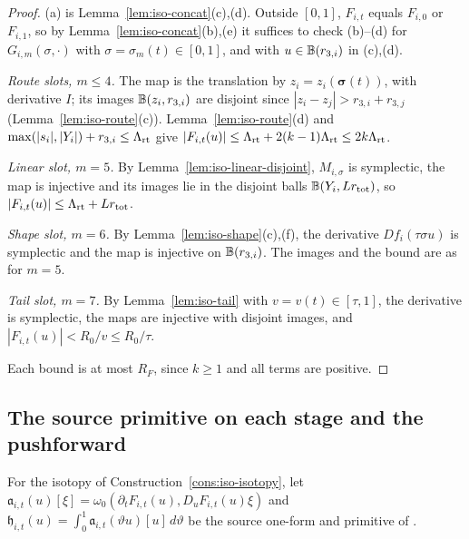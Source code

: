 \begin{proof}
(a) is Lemma~\ref{lem:iso-concat}(c),(d). Outside $[0,1]$, $F_{i,t}$ equals $F_{i,0}$ or $F_{i,1}$, so by Lemma~\ref{lem:iso-concat}(b),(e) it suffices to check (b)--(d) for $G_{i,m}(\sigma,\cdot)$ with $\sigma=\sigma_m(t)\in[0,1]$, and with $u\in\mathbb{B}(r_{3,i})$ in (c),(d).

\emph{Route slots, $m\le4$.} The map is the translation by $z_i=z_i(\boldsymbol\sigma(t))$, with derivative $I$; its images $\mathbb{B}(z_i,r_{3,i})$ are disjoint since $|z_i-z_j|>r_{3,i}+r_{3,j}$ (Lemma~\ref{lem:iso-route}(c)). Lemma~\ref{lem:iso-route}(d) and $\max(|s_i|,|Y_i|)+r_{3,i}\le\Lambda_{\rm rt}$ give $|F_{i,t}(u)|\le\Lambda_{\rm rt}+2(k-1)\Lambda_{\rm rt}\le2k\Lambda_{\rm rt}$.

\emph{Linear slot, $m=5$.} By Lemma~\ref{lem:iso-linear-disjoint}, $M_{i,\sigma}$ is symplectic, the map is injective and its images lie in the disjoint balls $\mathbb{B}(Y_i,Lr_{\rm tot})$, so $|F_{i,t}(u)|\le\Lambda_{\rm rt}+Lr_{\rm tot}$.

\emph{Shape slot, $m=6$.} By Lemma~\ref{lem:iso-shape}(c),(f), the derivative $Df_i(\tau\sigma u)$ is symplectic and the map is injective on $\mathbb{B}(r_{3,i})$. The images and the bound are as for $m=5$.

\emph{Tail slot, $m=7$.} By Lemma~\ref{lem:iso-tail} with $v=v(t)\in[\tau,1]$, the derivative is symplectic, the maps are injective with disjoint images, and $|F_{i,t}(u)|<R_0/v\le R_0/\tau$.

Each bound is at most $R_F$, since $k\ge1$ and all terms are positive.
\end{proof}

\subsection{The source primitive on each stage and the pushforward}\label{sec:iso-hamiltonian}

For the isotopy of Construction~\ref{cons:iso-isotopy}, let $\mathfrak a_{i,t}(u)[\xi]=\omega_0(\partial_tF_{i,t}(u),D_uF_{i,t}(u)\xi)$ and $\mathfrak h_{i,t}(u)=\int_0^1\mathfrak a_{i,t}(\vartheta u)[u]\,d\vartheta$ be the source one-form and primitive of .

